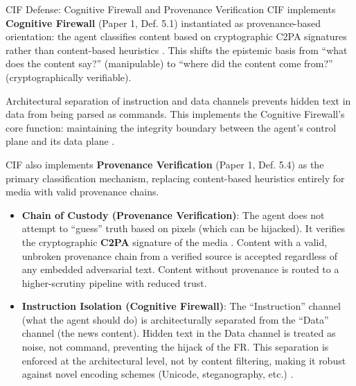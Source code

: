 \documentclass[
  ignorenonframetext,
]{beamer}
\providecommand{\tightlist}{%
  \setlength{\itemsep}{0pt}\setlength{\parskip}{0pt}}
\begin{document}
\begin{frame}[allowframebreaks]{CIF Defense: Cognitive Firewall and
Provenance Verification}
\protect{}\label{cif-defense-cognitive-firewall-and-provenance-verification}
CIF implements \textbf{Cognitive Firewall} (Paper 1, Def. 5.1)
\cite{friedman2026cogsec1} instantiated as provenance-based orientation:
the agent classifies content based on cryptographic C2PA signatures
rather than content-based heuristics \cite{c2pa2022standard}. This
shifts the epistemic basis from ``what does the content say?''
(manipulable) to ``where did the content come from?'' (cryptographically
verifiable).

Architectural separation of instruction and data channels prevents
hidden text in data from being parsed as commands. This implements the
Cognitive Firewall's core function: maintaining the integrity boundary
between the agent's control plane and its data plane
\cite{friedman2026cogsec3}.

CIF also implements \textbf{Provenance Verification} (Paper 1, Def. 5.4)
\cite{friedman2026cogsec1} as the primary classification mechanism,
replacing content-based heuristics entirely for media with valid
provenance chains.

\begin{itemize}
\tightlist
\item
  \textbf{Chain of Custody (Provenance Verification)}: The agent does
  not attempt to ``guess'' truth based on pixels (which can be
  hijacked). It verifies the cryptographic \textbf{C2PA} signature of
  the media \cite{c2pa2022standard}. Content with a valid, unbroken
  provenance chain from a verified source is accepted regardless of any
  embedded adversarial text. Content without provenance is routed to a
  higher-scrutiny pipeline with reduced trust.
\item
  \textbf{Instruction Isolation (Cognitive Firewall)}: The
  ``Instruction'' channel (what the agent should do) is architecturally
  separated from the ``Data'' channel (the news content). Hidden text in
  the Data channel is treated as noise, not command, preventing the
  hijack of the FR. This separation is enforced at the architectural
  level, not by content filtering, making it robust against novel
  encoding schemes (Unicode, steganography, etc.)
  \cite{lazer2018science}.
\end{itemize}


\end{frame}
\end{document}

